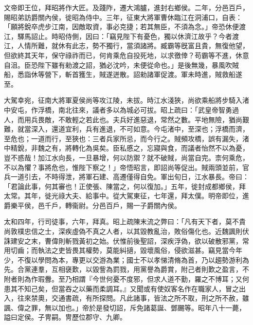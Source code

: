 \begin{pinyinscope}
文帝即王位，拜昭將作大匠。及踐阼，遷大鴻臚，進封右鄉侯。二年，分邑百戶，賜昭弟訪爵關內侯，徙昭為侍中。三年，征東大將軍曹休臨江在洞浦口，自表：「願將銳卒虎步江南，因敵取資，事必克捷；若其無臣，不須為念。」帝恐休便渡江，驛馬詔止。時昭侍側，因曰：「竊見陛下有憂色，獨以休濟江故乎？今者渡江，人情所難，就休有此志，勢不獨行，當須諸將。臧霸等旣富且貴，無復他望，但欲終其天年，保守祿祚而已，何肯乘危自投死地，以求徼倖？苟霸等不進，休意自沮。臣恐陛下雖有勑渡之詔，猶必沈吟，未便從命也。」是後無幾，暴風吹賊船，悉詣休等營下，斬首獲生，賊遂迸散。詔勑諸軍促渡。軍未時進，賊救船遂至。

大駕幸宛，征南大將軍夏侯尚等攻江陵，未拔。時江水淺狹，尚欲乘船將步騎入渚中安屯，作浮橋，南北往來，議者多以為城必可拔。昭上疏曰：「武皇帝智勇過人，而用兵畏敵，不敢輕之若此也。夫兵好進惡退，常然之數。平地無險，猶尚艱難，就當深入，還道宜利，兵有進退，不可如意。今屯渚中，至深也；浮橋而濟，至危也；一道而行，至狹也：三者兵家所忌，而今行之。賊頻攻橋，誤有漏失，渚中精銳，非魏之有，將轉化為吳矣。臣私慼之，忘寢與食，而議者怡然不以為憂，豈不惑哉！加江水向長，一旦暴增，何以防禦？就不破賊，尚當自完。柰何乘危，不以為懼？事將危也，惟陛下察之！」帝悟昭言，即詔尚等促出。賊兩頭並前，官兵一道引去，不時得泄，將軍石建、高遷僅得自免。軍出旬日，江水暴長。帝曰：「君論此事，何其審也！正使張、陳當之，何以復加。」五年，徙封成都鄉侯，拜太常。其年，徙光祿大夫、給事中。從大駕東征，七年還，拜太僕。明帝即位，進爵樂平侯，邑千戶，轉衞尉。分邑百戶，賜一子爵關內侯。

太和四年，行司徒事，六年，拜真。昭上疏陳末流之弊曰：「凡有天下者，莫不貴尚敦樸忠信之士，深疾虛偽不真之人者，以其毀教亂治，敗俗傷化也。近魏諷則伏誅建安之末，曹偉則斬戮黃初之始。伏惟前後聖詔，深疾浮偽，欲以破散邪黨，常用切齒；而執法之吏皆畏其權勢，莫能糾擿，毀壞風俗，侵欲滋甚。竊見當今年少，不復以學問為本，專更以交游為業；國士不以孝悌清脩為首，乃以趨勢游利為先。合黨連羣，互相襃歎，以毀訾為罰戮，用黨譽為爵賞，附己者則歎之盈言，不附者則為作瑕釁。至乃相謂『今世何憂不度邪，但求人道不勤，羅之不博耳；又何患其不知己矣，但當吞之以藥而柔調耳。』又聞或有使奴客名作在職家人，冒之出入，往來禁奧，交通書疏，有所探問。凡此諸事，皆法之所不取，刑之所不赦，雖諷、偉之罪，無以加也。」帝於是發切詔，斥免諸葛誕、鄧颺等。昭年八十一薨，謚曰定侯。子冑嗣。冑歷位郡守、九卿。


\end{pinyinscope}